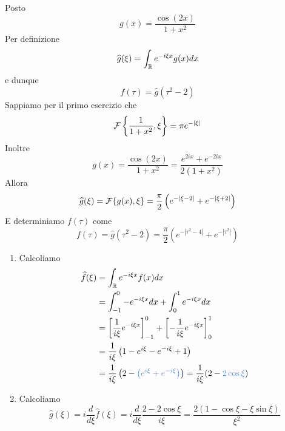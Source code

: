Posto
\begin{equation*}
g(x) = \frac{\cos(2x)}{1 + x^{2}}
\end{equation*}
Per definizione
\begin{equation*}
\widehat{g}(\xi) = \int_{\mathbb{R}} e^{- i\xi x} g(x) dx
\end{equation*}
e dunque
\begin{equation*}
f(\tau) = \hat{g}\left(\tau^{2} - 2\right)
\end{equation*}
Sappiamo per il primo esercizio che
\begin{equation*}
\mathcal{F} \left\{\frac{1}{1 + x^{2}}, \xi \right\} = \pi e^{- | \xi |}
\end{equation*}
Inoltre
\begin{equation*}
g(x) = \frac{\cos(2x)}{1 + x^{2}} = \frac{e^{2ix} + e^{- 2ix}}{2\left(1 + x^{2}\right)}
\end{equation*}
Allora
\begin{equation*}
\widehat{g}(\xi) = \mathcal{F} \{g(x), \xi \} = \frac{\pi}{2}\left(e^{- | \xi - 2|} + e^{- | \xi + 2|}\right)
\end{equation*}
E determiniamo $f(\tau)$ come
\begin{equation*}
f(\tau) = \hat{g}\left(\tau^{2} - 2\right) = \frac{\pi}{2}\left(e^{- \left| \tau^{2} - 4\right|} + e^{- \left| \tau^{2}\right|}\right)
\end{equation*}
\Soluzione
\begin{enumerate}
\item Calcoliamo
\begin{equation*}
\begin{aligned}
\hat{f}(\xi) & = \int_{\RR} e^{- i\xi x} f(x) dx\\
 & = \int^{0}_{- 1} - e^{- i\xi x} dx + \int^{1}_{0} e^{- i\xi x} dx\\
 & = \left[\frac{1}{i\xi} e^{- i\xi x}\right]^{0}_{- 1} + \left[ - \frac{1}{i\xi} e^{- i\xi x}\right]^{1}_{0}\\
 & = \frac{1}{i\xi}\left(1 - e^{i\xi} - e^{- i\xi} + 1\right)\\
 & = \frac{1}{i\xi}\left(2 - \textcolor[rgb]{0.29, 0.56, 0.89}{\left(e^{i\xi} + e^{- i\xi}\right)}\right) = \frac{1}{i\xi}(2 - \textcolor[rgb]{0.29, 0.56, 0.89}{2\cos\xi})
\end{aligned}
\end{equation*}
\item Calcoliamo
\begin{equation*}
\hat{g}(\xi) = i\frac{d}{d\xi}\hat{f}(\xi) = i\frac{d}{d\xi}\frac{2 - 2\cos \xi}{i\xi} = \frac{2(1 - \cos \xi - \xi \sin \xi)}{\xi^{2}}
\end{equation*}
\end{enumerate}
\Soluzione

